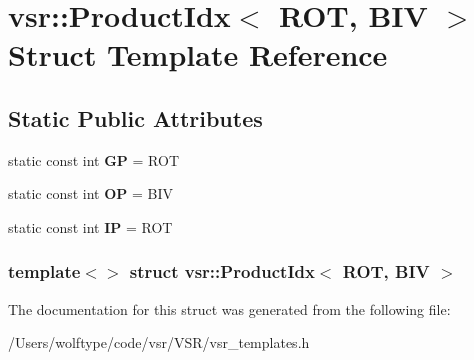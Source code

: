 \hypertarget{structvsr_1_1_product_idx_3_01_r_o_t_00_01_b_i_v_01_4}{\section{vsr\-:\-:Product\-Idx$<$ R\-O\-T, B\-I\-V $>$ Struct Template Reference}
\label{structvsr_1_1_product_idx_3_01_r_o_t_00_01_b_i_v_01_4}
}
\subsection*{Static Public Attributes}
\begin{DoxyCompactItemize}
\item 
\hypertarget{structvsr_1_1_product_idx_3_01_r_o_t_00_01_b_i_v_01_4_a54243eee8d42820a6c7c602f44781c74}{static const int {\bfseries G\-P} = R\-O\-T}\label{structvsr_1_1_product_idx_3_01_r_o_t_00_01_b_i_v_01_4_a54243eee8d42820a6c7c602f44781c74}

\item 
\hypertarget{structvsr_1_1_product_idx_3_01_r_o_t_00_01_b_i_v_01_4_ad1dd62a352cc1815ee06642da33a0f24}{static const int {\bfseries O\-P} = B\-I\-V}\label{structvsr_1_1_product_idx_3_01_r_o_t_00_01_b_i_v_01_4_ad1dd62a352cc1815ee06642da33a0f24}

\item 
\hypertarget{structvsr_1_1_product_idx_3_01_r_o_t_00_01_b_i_v_01_4_addfc9c4643a2ac63982126796b3ee82b}{static const int {\bfseries I\-P} = R\-O\-T}\label{structvsr_1_1_product_idx_3_01_r_o_t_00_01_b_i_v_01_4_addfc9c4643a2ac63982126796b3ee82b}

\end{DoxyCompactItemize}
\subsubsection*{template$<$$>$ struct vsr\-::\-Product\-Idx$<$ R\-O\-T, B\-I\-V $>$}



The documentation for this struct was generated from the following file\-:\begin{DoxyCompactItemize}
\item 
/\-Users/wolftype/code/vsr/\-V\-S\-R/vsr\-\_\-templates.\-h\end{DoxyCompactItemize}
